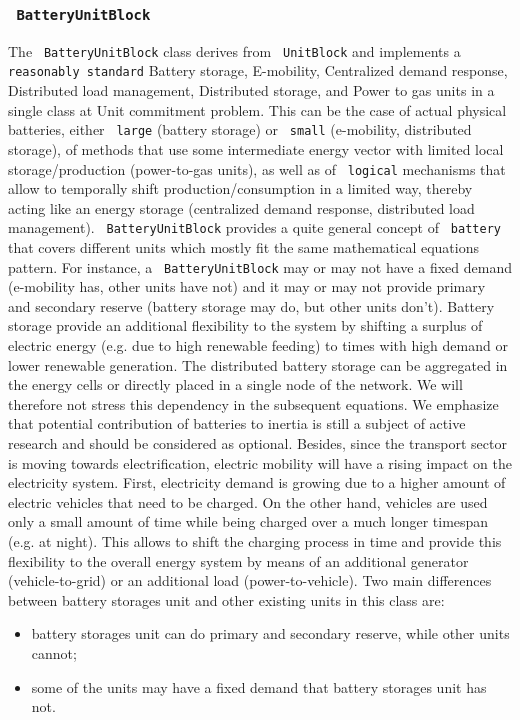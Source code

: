 \documentclass[a4paper]{article}
\newcommand{\code}[1]{\textrm{\texttt{\hyphenchar\font=200 #1}}}
\newcommand{\cstr}[1]{\code{#1}}
\begin{document}
\subsubsection {\code{BatteryUnitBlock}}
The \code{BatteryUnitBlock} class derives from \code{UnitBlock} and implements a \cstr{reasonably standard} Battery storage, E-mobility, Centralized demand response, Distributed load management, Distributed storage, and Power to gas units in a single class at Unit commitment problem. This can be the case of actual physical batteries, either \cstr{large} (battery storage) or \cstr{small} (e-mobility, distributed storage), of methods that use some intermediate energy vector with limited local storage/production (power-to-gas units), as well as of \cstr{logical} mechanisms that allow to temporally shift production/consumption in a limited way, thereby acting like an energy storage (centralized demand response, distributed load management). \code{BatteryUnitBlock} provides a quite general concept of \cstr{battery} that covers different units which mostly fit the same mathematical equations pattern. For instance, a \code{BatteryUnitBlock} may or may not have a fixed demand (e-mobility has, other units have not) and it may or may not provide primary and secondary reserve (battery storage may do, but other units don't). Battery storage provide an additional flexibility to the system by shifting a surplus of electric energy (e.g. due to high renewable feeding) to times with high demand or lower renewable generation. The distributed battery storage can be aggregated in the energy cells or directly placed in a single node of the network. We will therefore not stress this dependency in the subsequent equations. We emphasize that potential contribution of batteries to inertia is still a subject of active research and should be considered as optional. Besides, since the transport sector is moving towards electrification, electric mobility will have a rising impact on the electricity system. First, electricity demand is growing due to a higher amount of electric vehicles that need to be charged. On the other hand, vehicles are used only a small amount of time while being charged over a much longer timespan (e.g. at night). This allows to shift the charging process in time and provide this flexibility to the overall energy system by means of an additional generator (vehicle-to-grid) or an additional load (power-to-vehicle). Two main differences between battery storages unit and other existing units in this class are:
\begin{itemize}
 \item battery storages unit can do primary and secondary reserve, while other units cannot;
 \item some of the units may have a fixed demand that battery storages unit has not.
\end{itemize}
\end{document}
